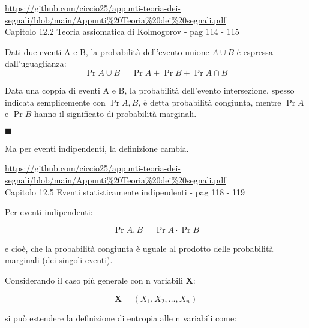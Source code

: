 \begin{tcolorbox}
    \url{https://github.com/ciccio25/appunti-teoria-dei-segnali/blob/main/Appunti%20Teoria%20dei%20segnali.pdf} \\
    Capitolo 12.2 Teoria assiomatica di Kolmogorov - pag 114 - 115 \newline 

    Dati due eventi A e B, la probabilità dell'evento unione $A \cup B$ è espressa dall'uguaglianza:
    {
        \Large 
        \begin{equation}
            \Pr{A \cup B} = \Pr{A} + \Pr{B} + \Pr{A \cap B}
        \end{equation}
    } 

Data una coppia di eventi A e B, la probabilità dell'evento intersezione, spesso indicata semplicemente con $\Pr{A, B}$, è detta probabilità congiunta, 
mentre $\Pr{A}$ e $\Pr{B}$ hanno il significato di probabilità marginali. \newline 

$\blacksquare$ \newline 

Ma per eventi indipendenti, la definizione cambia. \newline 

 \url{https://github.com/ciccio25/appunti-teoria-dei-segnali/blob/main/Appunti%20Teoria%20dei%20segnali.pdf} \\
    Capitolo 12.5 Eventi statisticamente indipendenti - pag 118 - 119 \newline 

    Per eventi indipendenti: 

{   
    \Large 
    \begin{equation}
        \Pr{A, B} = \Pr{A} \cdot \Pr{B}   
    \end{equation}
}

e cioè, che la probabilità congiunta è uguale al prodotto delle probabilità marginali (dei singoli eventi). \newline 

\end{tcolorbox}

Considerando il caso più generale con n variabili \textbf{X}: 

{
    \Large 
    \begin{equation}
        \textbf{X} = (X_1, X_2, \dots, X_n)
    \end{equation}
}

si può estendere la definizione di entropia alle n variabili come: 

